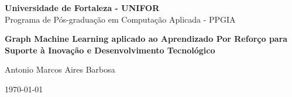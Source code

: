 \documentclass{article}
\begin{document}
\begin{titlepage}
    \centering
    \vspace*{1cm} %
    {\large \textbf{Universidade de Fortaleza - UNIFOR}\\ Programa de Pós-graduação em Computação Aplicada - PPGIA}
      
    \vspace*{4cm} %
    
    \begin{spacing}{1.5}
    \Large \textbf{Graph Machine Learning aplicado ao Aprendizado Por Reforço para Suporte à Inovação e Desenvolvimento Tecnológico}
    \end{spacing}
    
    \vspace*{4cm} %
    
    {\large Antonio Marcos Aires Barbosa} %

    \vfill %
    
    {\large \today} %
\end{titlepage}

\tableofcontents

\clearpage
{} %












\end{document}
